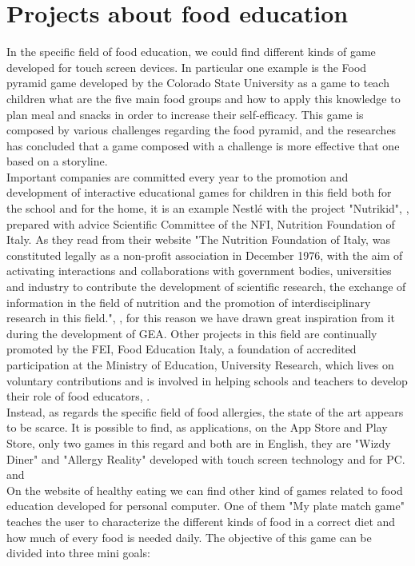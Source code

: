 \section{Projects about food education}
In the specific field of food education, we could find different kinds of game developed for touch screen devices. In particular one example is the Food pyramid game developed by the Colorado State University \cite{Serrano} as a game to teach children what are the five main food groups and how to apply this knowledge to plan meal and snacks in order to increase their self-efficacy. This game is composed by various challenges regarding the food pyramid, and the researches has concluded that a game composed with a challenge is more effective that one based on a storyline.\\
Important companies are committed every year to the promotion and development of interactive educational games for children in this field both for the school and for the home, it is an example Nestl\'e with the project "Nutrikid", \cite{Nutrikid}, prepared with advice Scientific Committee of the NFI, Nutrition Foundation of Italy. As they read from their website "The Nutrition Foundation of Italy, was constituted legally as a non-profit association in December 1976, with the aim of activating interactions and collaborations with government bodies, universities and industry to contribute the development of scientific research, the exchange of information in the field of nutrition and the promotion of interdisciplinary research in this field.", \cite{NFI}, for this reason we have drawn great inspiration from it during the development of GEA. Other projects in this field are continually promoted by the FEI, Food Education Italy, a foundation of accredited participation at the Ministry of Education, University Research, which lives on voluntary contributions and is involved in helping schools and teachers to develop their role of food educators, \cite{FEI}.\\
Instead, as regards the specific field of food allergies, the state of the art appears to be scarce. It is possible to find, as applications, on the App Store and Play Store, only two games in this regard and both are in English, they are "Wizdy Diner" and "Allergy Reality" developed with touch screen technology and for PC. \cite{Wizdy} and \cite{Allergy}\\
On the website of healthy eating \cite{Myplate} we can find other kind of games related to food education developed for personal computer. One of them "My plate match game" teaches the user to characterize the different kinds of food in a correct diet and how much of every food is needed daily. The objective of this game can be divided into three mini goals:
